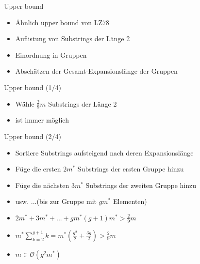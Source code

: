 \begin{frame}{\FrameName}
	\begin{block}{Upper bound}
    \begin{itemize}[<+->]
      \item Ähnlich upper bound von LZ78
      \item Auflistung von Substrings der Länge 2
      \item Einordnung in Gruppen
      \item Abschätzen der Gesamt-Expansionslänge der Gruppen
    \end{itemize}
\end{block}
\end{frame}

\begin{frame}{\FrameName}
	\begin{block}{Upper bound (1/4)}
    \begin{itemize}[<+->]
      \item Wähle $\frac{2}{9}m$ Substrings der Länge 2 \linebreak {}
      \item ist immer möglich
    \end{itemize}
\end{block}
\end{frame}

\begin{frame}{\FrameName}
	\begin{block}{Upper bound (2/4)}
    \begin{itemize}[<+->]
      \item Sortiere Substrings aufsteigend nach deren Expansionslänge
      \item Füge die ersten $2m^*$ Substrings der ersten Gruppe hinzu
      \item Füge die nächsten $3m^*$ Substrings der zweiten Gruppe hinzu
      \item usw. ...(bis zur Gruppe mit $gm^*$ Elementen)
      \item $2m^* + 3m^* + ... + gm^* (g+1)m^* > \frac{2}{9}m$
      \item $m^*\sum_{k=2}^{g+1}k = m^* (\frac{g^2}{2} + \frac{3g}{2}) > \frac{2}{9}m$
      \item $m\in \mathcal{O}(g^2 m^*)$
    \end{itemize}
\end{block}
\end{frame}

